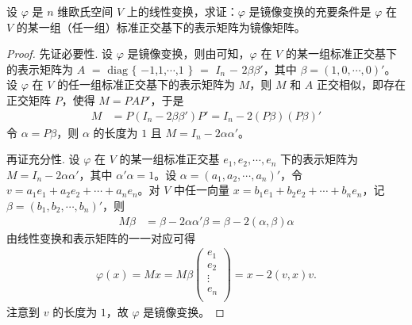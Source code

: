 \documentclass[../../main.tex]{subfiles}
\begin{document}
\begin{proposition}\label{proposition:例9.41}
设 \(\varphi\) 是 \(n\) 维欧氏空间 \(V\) 上的线性变换，求证：\(\varphi\) 是镜像变换的充要条件是 \(\varphi\) 在 \(V\) 的某一组（任一组）标准正交基下的表示矩阵为镜像矩阵。
\end{proposition}
\begin{proof}
先证必要性. 设 \(\varphi\) 是镜像变换，则由可知，\(\varphi\) 在 \(V\) 的某一组标准正交基下的表示矩阵为 $A$ $=$ $\mathrm{diag}$ $\{$ $-1$,$1$,$\cdots$,$1$ $\}$ $=$ $I_n$ $-$ $2\beta\beta'$，其中 \(\beta = (1,0,\cdots,0)'\)。设 \(\varphi\) 在 \(V\) 的任一组标准正交基下的表示矩阵为 \(M\)，则 \(M\) 和 \(A\) 正交相似，即存在正交矩阵 \(P\)，使得 \(M = PAP'\)，于是
\begin{align*}
M &= P(I_n - 2\beta\beta')P' = I_n - 2(P\beta)(P\beta)'
\end{align*}
令 \(\alpha = P\beta\)，则 \(\alpha\) 的长度为 \(1\) 且 \(M = I_n - 2\alpha\alpha'\)。

再证充分性. 设 \(\varphi\) 在 \(V\) 的某一组标准正交基 \(e_1,e_2,\cdots,e_n\) 下的表示矩阵为 \(M = I_n - 2\alpha\alpha'\)，其中 \(\alpha'\alpha = 1\)。设 \(\alpha = (a_1,a_2,\cdots,a_n)'\)，令 \(v = a_1e_1 + a_2e_2 + \cdots + a_ne_n\)。对 \(V\) 中任一向量 \(x = b_1e_1 + b_2e_2 + \cdots + b_ne_n\)，记 \(\beta = (b_1,b_2,\cdots,b_n)'\)，则
\begin{align*}
M\beta &= \beta - 2\alpha\alpha'\beta = \beta - 2(\alpha,\beta)\alpha
\end{align*}
由线性变换和表示矩阵的一一对应可得
\begin{align*}
\varphi (x)=Mx=M\beta \left( \begin{array}{c}
e_1\\
e_2\\
\vdots\\
e_n\\
\end{array} \right) =x-2(v,x)v.
\end{align*}
注意到 \(v\) 的长度为 \(1\)，故 \(\varphi\) 是镜像变换。

\end{proof}
\end{document}
